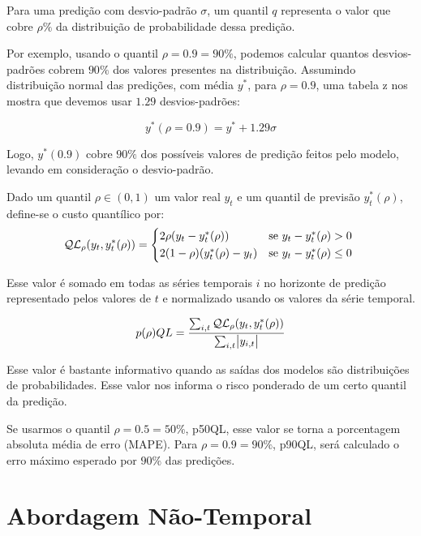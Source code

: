Para uma predição com desvio-padrão $\sigma$, um quantil $q$ representa o
valor que cobre $\rho\%$ da distribuição de probabilidade dessa predição.

Por exemplo, usando o quantil $\rho=0.9=90\%$, podemos calcular quantos
desvios-padrões cobrem $90\%$ dos valores presentes na distribuição.
Assumindo distribuição normal das predições, com média $y^*$, para $\rho=0.9$, uma tabela z nos mostra que devemos usar $1.29$ desvios-padrões:

\[
  y^*(\rho = 0.9) = y^* + 1.29\sigma
\]

Logo, $y^*(0.9)$ cobre $90\%$ dos possíveis valores de predição feitos pelo
modelo, levando em consideração o desvio-padrão.

Dado um quantil $\rho \in (0,1)$ um valor real $y_{t}$ e um quantil de previsão 
$y^{*}_{t}(\rho)$, define-se o custo quantílico por: \\

\begin{equation}
  \mathcal{QL}_{\rho}(y_{t},y^{*}_{t}(\rho)) =
\begin{cases*}
  2 \rho(y_{t} - y^{*}_{t}(\rho)) & se $ y_{t} - y^{*}_{t}(\rho) > 0$ \\
  2 (1 - \rho)(y^{*}_{t}(\rho) - y_{t}) & se $y_{t} - y^{*}_{t}(\rho) \leq 0$
\end{cases*}
\end{equation}


Esse valor é somado em todas as séries temporais $i$ no horizonte de predição
representado pelos valores de $t$ e normalizado usando os valores da série temporal.


\[
   p(\rho)QL = \frac{\sum_{i,t}\mathcal{QL}_{\rho}(y_{t},y^{*}_{t}(\rho))}{\sum_{i,t}\abs{y_{i,t}}}
\]


Esse valor é bastante informativo quando as saídas dos modelos são distribuições
de probabilidades. Esse valor nos informa o risco ponderado de um certo quantil
da predição.

Se usarmos o quantil $\rho=0.5=50\%$, p50QL,
esse valor se torna a porcentagem absoluta média de erro (MAPE). Para
$\rho=0.9=90\%$, p90QL, será
calculado o erro máximo esperado por $90\%$ das predições.





\section{Abordagem Não-Temporal} 


